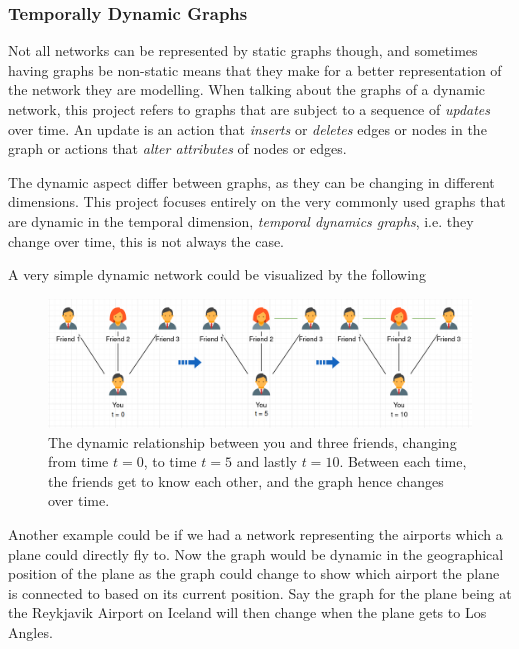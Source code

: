 \subsubsection{Temporally Dynamic Graphs}
\label{sec:Method:Graphs:DynamicGraphs}
Not all networks can be represented by static graphs though, and sometimes having graphs be non-static means that they make for a better representation of the network they are modelling. 
When talking about the graphs of a dynamic network, this project refers to graphs that are subject to a sequence of \textit{updates} over time. 
An update is an action that \textit{inserts} or \textit{deletes} edges or nodes in the graph or actions that \textit{alter attributes} of nodes or edges.

The dynamic aspect differ between graphs, as they can be changing in different dimensions. 
This project focuses entirely on the very commonly used graphs that are dynamic in the temporal dimension, \textit{temporal dynamics graphs}, i.e. they change over time, this is not always the case. 

A very simple dynamic network could be visualized by the following 

\begin{figure}[H]
    \centering
    \includegraphics[width=\textwidth]{0_images/dynamic_graph.png}
    \caption{The dynamic relationship between you and three friends, changing from time $t=0$, to time $t=5$ and lastly $t=10$. Between each time, the friends get to know each other, and the graph hence changes over time.}
    \label{fig:StaticGraph}
\end{figure}


Another example could be if we had a network representing the airports which a plane could directly fly to. 
Now the graph would be dynamic in the geographical position of the plane as the graph could change to show which airport the plane is connected to based on its current position. 
Say the graph for the plane being at the Reykjavik Airport on Iceland will then change when the plane gets to Los Angles.










